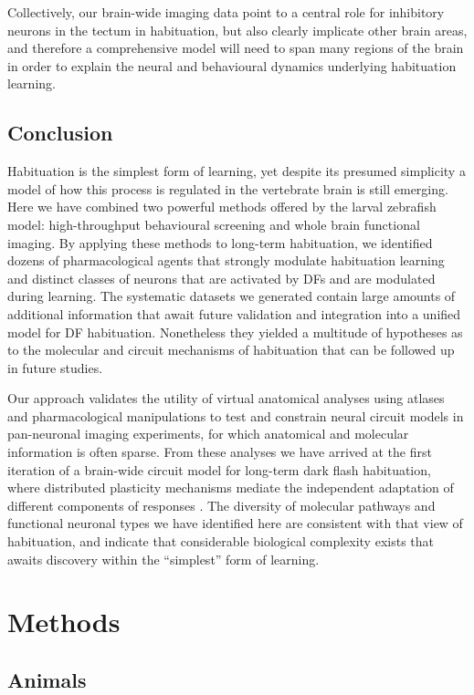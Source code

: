 \documentclass[9pt,lineno]{RandlettLab_elife}
\begin{document}
Collectively, our brain-wide imaging data point to a central role for inhibitory neurons in the tectum in habituation, but also clearly implicate other brain areas, and therefore a comprehensive model will need to span many regions of the brain in order to explain the neural and behavioural dynamics underlying habituation learning. 

\subsection{Conclusion}

Habituation is the simplest form of learning, yet despite its presumed simplicity a model of how this process is regulated in the vertebrate brain is still emerging. Here we have combined two powerful methods offered by the larval zebrafish model: high-throughput behavioural screening and whole brain functional imaging. By applying these methods to long-term habituation, we identified dozens of pharmacological agents that strongly modulate habituation learning and distinct classes of neurons that are activated by DFs and are modulated during learning. The systematic datasets we generated contain large amounts of additional information that await future validation and integration into a unified model for DF habituation. Nonetheless they yielded a multitude of hypotheses as to the molecular and circuit mechanisms of habituation that can be followed up in future studies. 

Our approach validates the utility of virtual anatomical analyses using atlases and pharmacological manipulations to test and constrain neural circuit models in pan-neuronal imaging experiments, for which anatomical and molecular information is often sparse. From these analyses we have arrived at the first iteration of a brain-wide circuit model for long-term dark flash habituation, where distributed plasticity mechanisms mediate the independent adaptation of different components of responses \cite{Randlett2019-fi}. The diversity of molecular pathways and functional neuronal types we have identified here are consistent with that view of habituation, and indicate that considerable biological complexity exists that awaits discovery within the “simplest” form of learning. 


\section{Methods}

\subsection{Animals}
\end{document}
